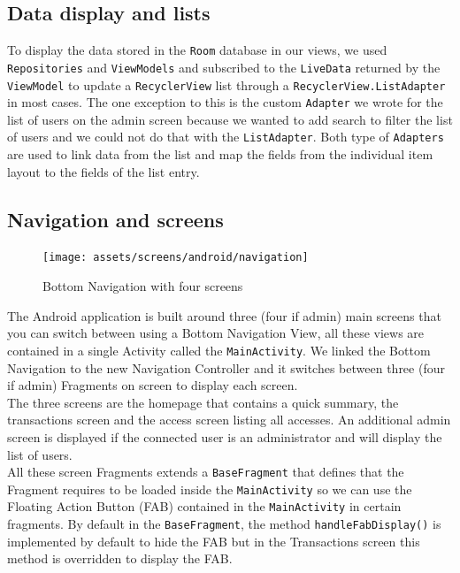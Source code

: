 \documentclass[twoside, openright,11pt,a4paper]{book}
\begin{document}
\subsection{Data display and lists}
To display the data stored in the \verb+Room+ database in our views, we used \verb+Repositories+ and \verb+ViewModels+ and subscribed to the \verb+LiveData+ returned by the \verb+ViewModel+ to update a \verb+RecyclerView+ list through a \verb+RecyclerView.ListAdapter+ in most cases. The one exception to this is the custom \verb+Adapter+ we wrote for the list of users on the admin screen because we wanted to add search to filter the list of users and we could not do that with the \verb+ListAdapter+. Both type of \verb+Adapters+ are used to link data from the list and map the fields from the individual item layout to the fields of the list entry.

\subsection{Navigation and screens}
\begin{figure}[H]
\begin{center}
	\texttt{[image: assets/screens/android/navigation]}
	\caption{Bottom Navigation with four screens}
\end{center}
\end{figure}

The Android application is built around three (four if admin) main screens that you can switch between using a Bottom Navigation View\cite{android:doc:material:bottom_nav}, all these views are contained in a single Activity called the \verb+MainActivity+. We linked the Bottom Navigation to the new Navigation Controller and it switches between three (four if admin) Fragments on screen to display each screen.\\ The three screens are the homepage that contains a quick summary, the transactions screen and the access screen listing all accesses. An additional admin screen is displayed if the connected user is an administrator and will display the list of users. \\

All these screen Fragments extends a \verb+BaseFragment+ that defines that the Fragment requires to be loaded inside the \verb+MainActivity+ so we can use the Floating Action Button (FAB) contained in the \verb+MainActivity+ in certain fragments. By default in the \verb+BaseFragment+, the method \verb+handleFabDisplay()+ is implemented by default to hide the FAB but in the Transactions screen this method is overridden to display the FAB. 
\end{document}

